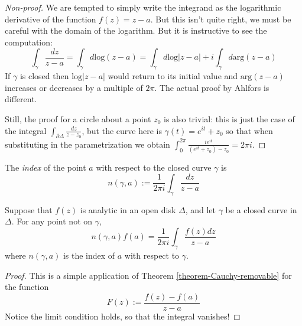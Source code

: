 \begin{proof}[Non-proof]
We are tempted to simply write the integrand as the logarithmic derivative of
the function $f(z)=z-a$. But this isn't quite right, we must be careful with the
domain of the logarithm. But it is instructive to see the computation:
$$
\int_\gamma\frac{dz}{z-a}=\int_\gamma d \text{log}(z-a)=
\int_\gamma d\text{log}|z-a|+i\int_\gamma d \text{arg}(z-a)
$$
If  $\gamma$ is closed then $\text{log}|z-a|$ would return to its initial value
and $\text{arg}(z-a)$ increases or decreases by a multiple of $2\pi$. The actual
proof by Ahlfors is different.

Still, the proof for a circle about a point $z_0$ is also trivial: this is just
the case of the integral $\int_{\partial\Delta}\frac{dz}{z-z_0}$, but the curve
here is  $\gamma(t)=e^{it}+z_0$ so that when substituting in the parametrization
we obtain $\int_0^{2\pi}\frac{ie^{it}}{(e^{it}+z_0)-z_0}=2\pi i$.
\end{proof}

\begin{definition}
\label{definition-index}
The {\it index} of the point $a$ with respect to the closed curve $\gamma$ is
\begin{equation}
\label{equation-index}
n(\gamma,a):=\frac{1}{2\pi i}\int_\gamma\frac{dz}{z-a}
\end{equation}
\end{definition}

\begin{theorem}
\label{theorem-Cauchy-integral-formula}
\begin{reference}
\cite[Section 2.2, Theorem 6]{ahl}
\end{reference}
Suppose that $f(z)$ is analytic in an open disk $\Delta$, and let $\gamma$ be a
closed curve in $\Delta$. For any point not on $\gamma$,
\begin{equation}
\label{equation-Cauchy-formula-with-index}
n(\gamma,a)f(a)=\frac{1}{2\pi i}\int_\gamma\frac{f(z)dz}{z-a}
\end{equation}
where $n(\gamma,a)$ is the index of $a$ with respect to $\gamma$.
\end{theorem}

\begin{proof}
This is a simple application of Theorem \ref{theorem-Cauchy-removable} for the
function
$$
F(z):=\frac{f(z)-f(a)}{z-a}
$$
Notice the limit condition holds, so that the integral vanishes!
\end{proof}

